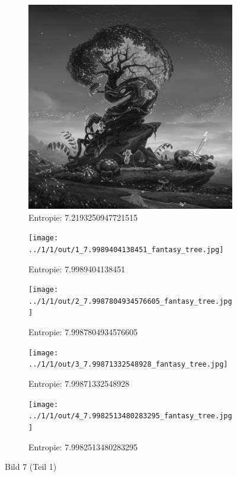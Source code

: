 \begin{figure}
	\centering

	\begin{subfigure}{0.25\textwidth}
		\includegraphics[width=\textwidth]{../1/3/gray_7.2193250947721515_fantasy_tree.jpg}
		\caption{Entropie: 7.2193250947721515}
	\end{subfigure}

	\begin{subfigure}{0.25\textwidth}
		\texttt{[image: ../1/1/out/1\_7.9989404138451\_fantasy\_tree.jpg]}
		\caption{Entropie: 7.9989404138451}
	\end{subfigure}

	\begin{subfigure}{0.25\textwidth}
		\texttt{[image: ../1/1/out/2\_7.9987804934576605\_fantasy\_tree.jpg]}
		\caption{Entropie: 7.9987804934576605}
	\end{subfigure}

	\begin{subfigure}{0.25\textwidth}
		\texttt{[image: ../1/1/out/3\_7.99871332548928\_fantasy\_tree.jpg]}
		\caption{Entropie: 7.99871332548928}
	\end{subfigure}

	\begin{subfigure}{0.25\textwidth}
		\texttt{[image: ../1/1/out/4\_7.9982513480283295\_fantasy\_tree.jpg]}
		\caption{Entropie: 7.9982513480283295}
	\end{subfigure}
	\caption{Bild 7 (Teil 1)}
\end{figure}
